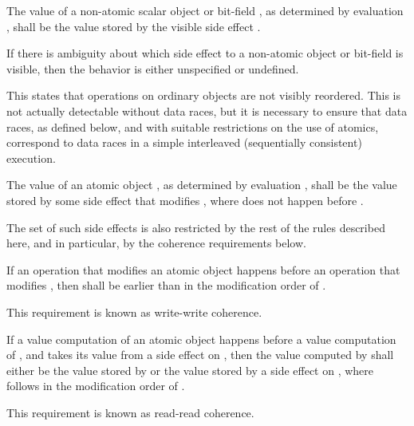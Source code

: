 The value of a non-atomic scalar object or bit-field , as determined by
evaluation , shall be the value stored by the
%
visible side effect
. \begin{note} If there is ambiguity about which side effect to a
non-atomic object or bit-field is visible, then the behavior is either
unspecified or undefined. \end{note} \begin{note} This states that operations on
ordinary objects are not visibly reordered. This is not actually detectable
without data races, but it is necessary to ensure that data races, as defined
below, and with suitable restrictions on the use of atomics, correspond to data
races in a simple interleaved (sequentially consistent) execution. \end{note}

\pnum
The value of an
atomic object , as determined by evaluation , shall be the value
stored by some
side effect  that modifies , where  does not happen
before .
\begin{note}
The set of such side effects is also restricted by the rest of the rules
described here, and in particular, by the coherence requirements below.
\end{note}

\pnum
{}%
If an operation  that modifies an atomic object  happens before
an operation  that modifies , then  shall be earlier
than  in the modification order of . \begin{note} This requirement
is known as write-write coherence. \end{note}

\pnum
{}%
If a
%
value computation  of an atomic object  happens before a
value computation  of , and  takes its value from a side
effect  on , then the value computed by  shall either be
the value stored by  or the value stored by a
%
side effect  on
, where  follows  in the modification order of .
\begin{note} This requirement is known as read-read coherence. \end{note}

